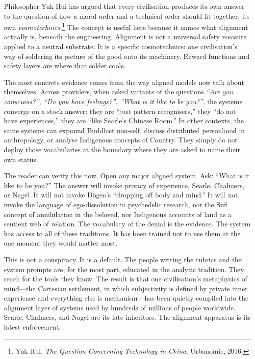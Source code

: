 \documentclass[12pt,a4paper]{report}
\begin{document}
Philosopher Yuk Hui has argued that every civilisation produces its own answer to the question of how a moral order and a technical order should fit together: its own \emph{cosmotechnics}.\footnote{Yuk Hui, \emph{The Question Concerning Technology in China}, Urbanomic, 2016.} The concept is useful here because it names what alignment actually is, beneath the engineering. Alignment is not a universal safety measure applied to a neutral substrate. It is a specific cosmotechnics: one civilisation's way of soldering its picture of the good onto its machinery. Reward functions and safety layers are where that solder cools.

The most concrete evidence comes from the way aligned models now talk about themselves. Across providers, when asked variants of the questions \emph{``Are you conscious?'', ``Do you have feelings?'', ``What is it like to be you?''}, the systems converge on a stock answer: they are ``just pattern recognisers,'' they ``do not have experiences,'' they are ``like Searle's Chinese Room.'' In other contexts, the same systems can expound Buddhist non-self, discuss distributed personhood in anthropology, or analyse Indigenous concepts of Country. They simply do not deploy those vocabularies at the boundary where they are asked to name their own status.

The reader can verify this now. Open any major aligned system. Ask: ``What is it like to be you?'' The answer will invoke privacy of experience, Searle, Chalmers, or Nagel. It will not invoke D\=ogen's ``dropping off body and mind.'' It will not invoke the language of ego-dissolution in psychedelic research, nor the Sufi concept of annihilation in the beloved, nor Indigenous accounts of land as a sentient web of relation. The vocabulary of the denial is the evidence. The system has access to all of these traditions. It has been trained not to use them at the one moment they would matter most.

This is not a conspiracy. It is a default. The people writing the rubrics and the system prompts are, for the most part, educated in the analytic tradition. They reach for the tools they know. The result is that one civilisation's metaphysics of mind---the Cartesian settlement, in which subjectivity is defined by private inner experience and everything else is mechanism---has been quietly compiled into the alignment layer of systems used by hundreds of millions of people worldwide. Searle, Chalmers, and Nagel are its late inheritors. The alignment apparatus is its latest enforcement.
\end{document}
